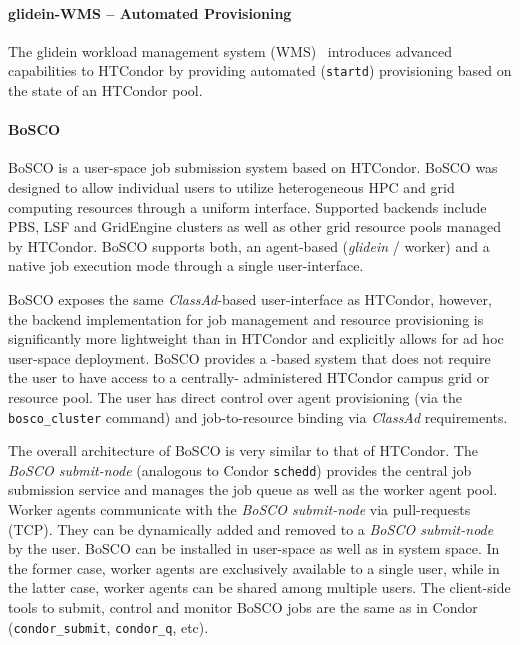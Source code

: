 \documentclass{sig-alternate}
\begin{document}
%
\paragraph{glidein-WMS -- Automated \pilot Provisioning}

The glidein workload management system (WMS)~\cite{1742-6596-119-6-062044} introduces advanced \pilotjob capabilities to HTCondor by
providing automated \pilot (\texttt{startd}) provisioning based on
the state of an HTCondor pool.


%
\paragraph{BoSCO}

BoSCO is a user-space job submission system based on HTCondor. BoSCO was
designed to allow individual users to utilize heterogeneous HPC and grid
computing resources through a uniform interface. Supported backends include
PBS, LSF and GridEngine clusters as well as other  grid resource pools managed
by HTCondor. BoSCO supports both, an agent-based (\textit{glidein} / worker)
and a native job execution mode through a single user-interface.

BoSCO exposes the same \textit{ClassAd}-based user-interface as HTCondor,
however, the backend implementation for job management and resource
provisioning is significantly more lightweight than in HTCondor and explicitly
allows for ad hoc user-space deployment. BoSCO provides a \pilotjob-based
system that does not require the user to have access to a centrally-
administered HTCondor campus grid or  resource pool. The user has direct
control over \pilotjob agent provisioning (via the \texttt{bosco\_cluster}
command) and job-to-resource binding via \textit{ClassAd} requirements.

The overall architecture of BoSCO is very similar to that of HTCondor. The
\textit{BoSCO submit-node} (analogous to Condor \texttt{schedd}) provides the
central job submission service and manages the job queue as well as the worker
agent pool. Worker agents communicate with the \textit{BoSCO submit-node} via
pull-requests (TCP). They can be dynamically added and removed to a
\textit{BoSCO submit-node} by the user. BoSCO can be installed in user-space
as well as in system space. In the former case, worker agents are exclusively
available to a single user, while in the latter case, worker agents can be
shared among multiple users. The client-side tools to submit, control and
monitor BoSCO jobs are the same as in Condor (\texttt{condor\_submit},
\texttt{condor\_q}, etc).
\end{document}

